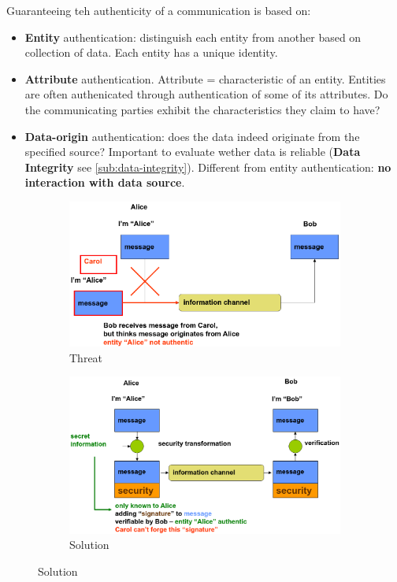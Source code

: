 \documentclass[11pt,british,faculty=ea,layout=titlefont,underline=false,titleUppercase=true,titleUnderline=true,hidelinks]{ugent2016-report}
\begin{document}
            Guaranteeing teh authenticity of a communication is based on:
            \begin{itemize}
                \item \textbf{Entity} authentication: distinguish each entity from another based on collection of data. Each entity has a unique identity.
                \item \textbf{Attribute} authentication. Attribute = characteristic of an entity. Entities are often authenicated through authentication of some of its attributes. Do the communicating parties exhibit the characteristics they claim to have?
                \item \textbf{Data-origin} authentication: does the data indeed originate from the specified source? Important to evaluate wether data is reliable (\textbf{Data Integrity} see \ref{sub:data-integrity}). Different from entity authentication: \textbf{no interaction with data source}.
            \end{itemize}
            \begin{figure}[h]
                \centering
                \begin{subfigure}{.40\textwidth}
                    \centering
                    \includegraphics[width=\linewidth]{images/authentication-threat.png}
                    \caption{Threat}
                    \label{fig:authentication-threat}
                \end{subfigure}
                \begin{subfigure}{.50\textwidth}
                    \centering
                    \includegraphics[width=\linewidth]{images/authentication-threat-solution.png}
                    \caption{Solution}
                    \label{fig:authentication-threat-solution}
                \end{subfigure}
            \end{figure}
\end{document}
